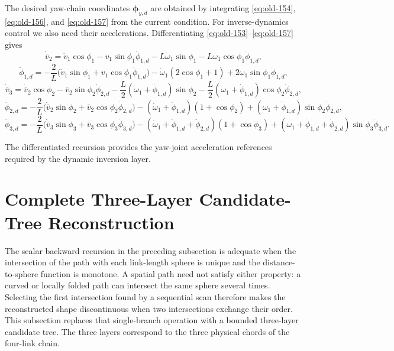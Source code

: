 \documentclass[12pt,a4paper]{report}
\newcommand{\formulaannotation}[1]{\par\noindent{}#1\par\vspace{0.35em}}
\begin{document}
The desired yaw-chain coordinates $\boldsymbol{\phi}_{y,d}$ are obtained by integrating \eqref{eq:old-154}, \eqref{eq:old-156}, and \eqref{eq:old-157} from the current condition. For inverse-dynamics control we also need their accelerations. Differentiating \eqref{eq:old-153}--\eqref{eq:old-157} gives
\begin{equation}
\dot{\bar{v}}_2 =
\dot{v}_1 \cos \phi_1
- v_1 \sin \phi_1 \dot{\phi}_{1,d}
- L\dot{\omega}_1 \sin \phi_1
- L\omega_1 \cos \phi_1 \dot{\phi}_{1,d},
\end{equation}
\begin{equation}
\ddot{\phi}_{1,d} =
-\frac{2}{L}
\bigl(
\dot{v}_1 \sin \phi_1 + v_1 \cos \phi_1 \dot{\phi}_{1,d}
\bigr)
-\dot{\omega}_1 (2 \cos \phi_1 + 1)
+ 2 \omega_1 \sin \phi_1 \dot{\phi}_{1,d},
\end{equation}
\begin{equation}
\dot{\bar{v}}_3 =
\dot{\bar{v}}_2 \cos \phi_2
- \bar{v}_2 \sin \phi_2 \dot{\phi}_{2,d}
- \frac{L}{2}(\dot{\omega}_1 + \ddot{\phi}_{1,d})\sin\phi_2
- \frac{L}{2}(\omega_1 + \dot{\phi}_{1,d})\cos\phi_2 \dot{\phi}_{2,d},
\end{equation}
\begin{equation}
\ddot{\phi}_{2,d} =
-\frac{2}{L}
\bigl(
\dot{\bar{v}}_2 \sin \phi_2 + \bar{v}_2 \cos \phi_2 \dot{\phi}_{2,d}
\bigr)
- (\dot{\omega}_1 + \ddot{\phi}_{1,d})(1+\cos\phi_2)
+ (\omega_1 + \dot{\phi}_{1,d})\sin\phi_2 \dot{\phi}_{2,d},
\end{equation}
\begin{equation}
\ddot{\phi}_{3,d} =
-\frac{2}{L}
\bigl(
\dot{\bar{v}}_3 \sin \phi_3 + \bar{v}_3 \cos \phi_3 \dot{\phi}_{3,d}
\bigr)
- (\dot{\omega}_1 + \ddot{\phi}_{1,d} + \ddot{\phi}_{2,d})(1+\cos\phi_3)
+ (\omega_1 + \dot{\phi}_{1,d} + \dot{\phi}_{2,d})\sin\phi_3 \dot{\phi}_{3,d}.
\end{equation}
\formulaannotation{The differentiated recursion provides the yaw-joint acceleration references required by the dynamic inversion layer.}

\section{Complete Three-Layer Candidate-Tree Reconstruction}
\label{sec:chapter8-candidate-tree}

The scalar backward recursion in the preceding subsection is adequate when the
intersection of the path with each link-length sphere is unique and the
distance-to-sphere function is monotone. A spatial path need not satisfy
either property: a curved or locally folded path can intersect the same sphere
several times. Selecting the first intersection found by a sequential scan
therefore makes the reconstructed shape discontinuous when two intersections
exchange their order. This subsection replaces that single-branch operation
with a bounded three-layer candidate tree. The three layers correspond to the
three physical chords of the four-link chain.
\end{document}
